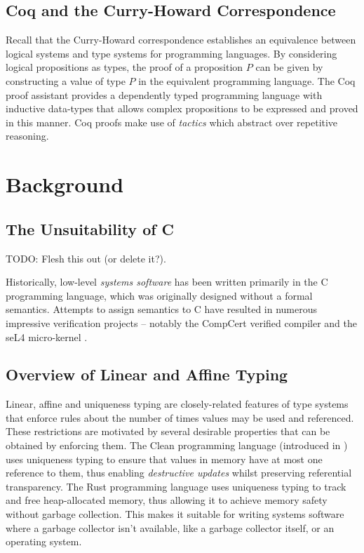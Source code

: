 \documentclass[]{unswthesis}
\let\i\textit
\begin{document}
\section{Coq and the Curry-Howard Correspondence}
\label{sec:curry_howard}

Recall that the Curry-Howard correspondence establishes an equivalence between logical systems and type systems for programming languages. By considering logical propositions as types, the proof of a proposition $P$ can be given by constructing a value of type $P$ in the equivalent programming language. The Coq proof assistant provides a dependently typed programming language with inductive data-types that allows complex propositions to be expressed and proved in this manner. Coq proofs make use of \i{tactics} which abstract over repetitive reasoning.

\chapter{Background}
\label{ch:background}

\section{The Unsuitability of C}

TODO: Flesh this out (or delete it?).

Historically, low-level \textit{systems software} has been written primarily in the C programming language, which was originally designed without a formal semantics. Attempts to assign semantics to C have resulted in numerous impressive verification projects -- notably the CompCert verified compiler \cite{leroy09} and the seL4 micro-kernel \cite{klein14}.

\section{Overview of Linear and Affine Typing}

Linear, affine and uniqueness typing are closely-related features of type systems that enforce rules about the number of times values may be used and referenced. These restrictions are motivated by several desirable properties that can be obtained by enforcing them. The Clean programming language (introduced in \cite{clean87}) uses uniqueness typing to ensure that values in memory have at most one reference to them, thus enabling \i{destructive updates} whilst preserving referential transparency. The Rust programming language \cite{rustWeb} uses uniqueness typing to track and free heap-allocated memory, thus allowing it to achieve memory safety without garbage collection. This makes it suitable for writing systems software where a garbage collector isn't available, like a garbage collector itself, or an operating system.
\end{document}
